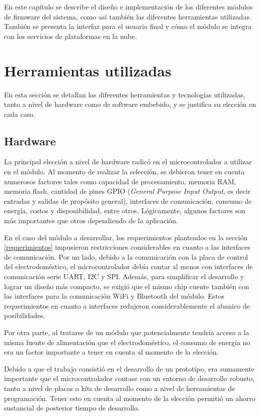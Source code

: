 En este capítulo se describe el diseño e implementación de los diferentes módulos de firmware del sistema, como así también las diferentes herramientas utilizadas. También se presenta la interfaz para el usuario final y cómo el módulo se integra con los servicios de plataformas en la nube.

\section{Herramientas utilizadas}

En esta sección se detallan las diferentes herramientas y tecnologías utilizadas, tanto a nivel de hardware como de software embebido, y se justifica su elección en cada caso.

\subsection{Hardware}

La principal elección a nivel de hardware radicó en el microcontrolador a utilizar en el módulo. Al momento de realizar la selección, se debieron tener en cuenta numerosos factores tales como capacidad de procesamiento, memoria RAM, memoria flash, cantidad de pines GPIO (\emph{General Purpose Input Output}, es decir entradas y salidas de propósito general), interfaces de comunicación, consumo de energía, costos y disponibilidad, entre otros. Lógicamente, algunos factores son más importantes que otros dependiendo de la aplicación.

En el caso del módulo a desarrollar, los requerimientos planteados en la sección \ref{requerimientos} impusieron restricciones considerables en cuanto a las interfaces de comunicación. Por un lado, debido a la comunicación con la placa de control del electrodoméstico, el microcontrolador debía contar al menos con interfaces de comunicación serie UART, I2C y SPI. Además, para simplificar el desarrollo y lograr un diseño más compacto, se exigió que el mismo chip cuente también con las interfaces para la comunicación WiFi y Bluetooth del módulo. Estos requerimientos en cuanto a interfaces redujeron considerablemente el abanico de posibilidades.

Por otra parte, al tratarse de un módulo que potencialmente tendría acceso a la misma fuente de alimentación que el electrodoméstico, el consumo de energía no era un factor importante a tener en cuenta al momento de la elección.

Debido a que el trabajo consistió en el desarrollo de un prototipo, era sumamente importante que el microcontrolador contase con un entorno de desarrollo robusto, tanto a nivel de placas o kits de desarrollo como a nivel de herramientas de programación. Tener esto en cuenta al momento de la elección permitió un ahorro sustancial de posterior tiempo de desarrollo. 

